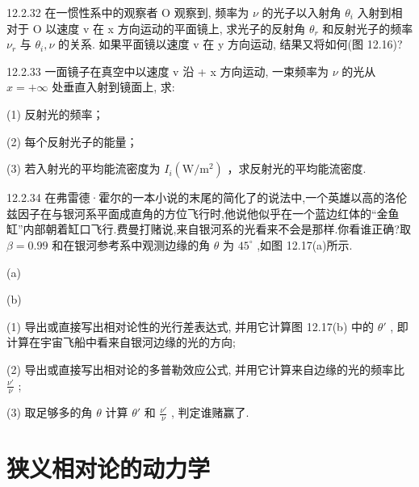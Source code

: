 \begin{problem}{12.2.32}
在一惯性系中的观察者 O 观察到, 频率为 $\nu$ 的光子以入射角 $\theta_{i}$ 入射到相对于 O 以速度 v 在 x 方向运动的平面镜上, 求光子的反射角 $\theta_{r}$ 和反射光子的频率 $\nu_{r}$ 与 $\theta_{i}, \nu$ 的关系. 如果平面镜以速度 v 在 y 方向运动, 结果又将如何(图 12.16)?
\begin{center}

\end{center}
\end{problem}
\clearpage


\begin{problem}{12.2.33}
一面镜子在真空中以速度 v 沿 + x 方向运动, 一束频率为 $\nu$ 的光从 $x = +\infty$ 处垂直入射到镜面上, 求:

(1) 反射光的频率；

(2) 每个反射光子的能量；

(3) 若入射光的平均能流密度为 $I_{i}(\mathrm{W}/\mathrm{m}^{2})$ ，求反射光的平均能流密度.
\end{problem}
\clearpage


\begin{problem}{12.2.34}
在弗雷德·霍尔的一本小说的末尾的简化了的说法中,一个英雄以高的洛伦兹因子在与银河系平面成直角的方位飞行时,他说他似乎在一个蓝边红体的“金鱼缸”内部朝着缸口飞行.费曼打赌说,来自银河系的光看来不会是那样.你看谁正确?取 $\beta=0.99$ 和在银河参考系中观测边缘的角 $\theta$ 为 $45^{\circ}$ ,如图 12.17(a)所示.

(a)

(b)

(1) 导出或直接写出相对论性的光行差表达式, 并用它计算图 12.17(b) 中的 $\theta'$ , 即计算在宇宙飞船中看来自银河边缘的光的方向;

(2) 导出或直接写出相对论的多普勒效应公式, 并用它计算来自边缘的光的频率比 $\frac{\nu'}{\nu}$ ;

(3) 取足够多的角 $\theta$ 计算 $\theta'$ 和 $\frac{\nu'}{\nu}$ , 判定谁赌赢了.
\begin{center}

\end{center}
\begin{center}

\end{center}
\end{problem}
\clearpage


\section{狭义相对论的动力学}


